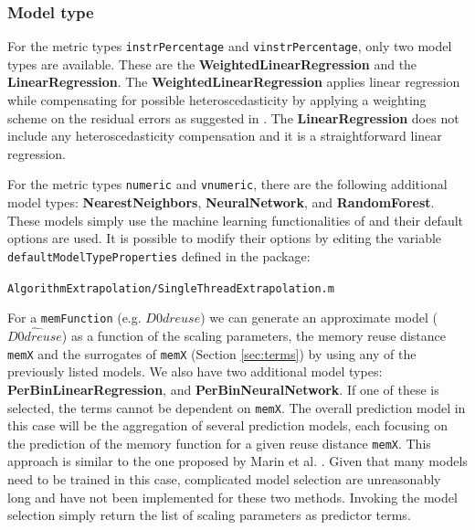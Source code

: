 \documentclass[a4paper, 10pt]{article}
\begin{document}
\subsubsection{Model type}
\label{sec:modelType}
For the metric types \verb!instrPercentage! and \verb!vinstrPercentage!, only two model types are available.
These are the \textbf{WeightedLinearRegression} and the \textbf{LinearRegression}. The \textbf{WeightedLinearRegression}
applies linear regression while compensating for possible heteroscedasticity 
by applying a weighting scheme on the residual errors as suggested in \cite{mariani2016ijpp}.
The \textbf{LinearRegression} does not include any heteroscedasticity compensation and it is a straightforward linear regression.

For the metric types \verb!numeric! and \verb!vnumeric!, there are the following additional model types:
\textbf{NearestNeighbors}, \textbf{NeuralNetwork}, and \textbf{RandomForest}. These models 
simply use the machine learning functionalities of \mathe
and their default options are used. It is possible to modify their options by editing the variable \verb!defaultModelTypeProperties!
defined in the package:

\verb!AlgorithmExtrapolation/SingleThreadExtrapolation.m!

For a \verb!memFunction! (e.g. $D0dreuse$) we can generate an
approximate model ($\widehat{D0dreuse}$) as a function of the scaling parameters, the memory reuse distance \verb!memX!
and the surrogates of \verb!memX! (Section \ref{sec:terms}) by using any of the previously listed models.
We also have two additional model types: \textbf{PerBinLinearRegression}, and \textbf{PerBinNeuralNetwork}.
If one of these is selected, the terms cannot be dependent on \verb!memX!. The overall prediction model in this case
will be the aggregation of several prediction models, each focusing on the prediction of the memory function for a given
reuse distance \verb!memX!. This approach is similar to the one proposed by Marin et al. \cite{marin2004}.
Given that many models need to be trained in this case, complicated model selection are unreasonably long and have not been
implemented for these two methods. Invoking the model selection simply return the list of scaling parameters as predictor terms.
\end{document}
